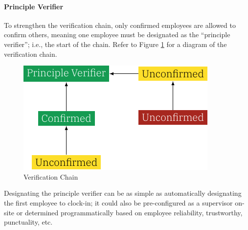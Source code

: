 \paragraph{Principle Verifier}

To strengthen the verification chain, only confirmed
employees are allowed to confirm others, meaning one
employee must be designated as the \enquote{principle
  verifier}; i.e., the start of the chain.
Refer to Figure \ref{fig:verificationTree} for a diagram of
the verification chain.

\begin{figure}[h]
  \centering
  \includegraphics{05 design/assets/verification tree.pdf}
  \caption{Verification Chain}
  \label{fig:verificationTree}
\end{figure}

Designating the principle verifier can be as simple as
automatically designating the first employee to clock-in;
it could also be pre-configured as a supervisor on-site or
determined programmatically based on employee reliability,
trustworthy, punctuality, etc.